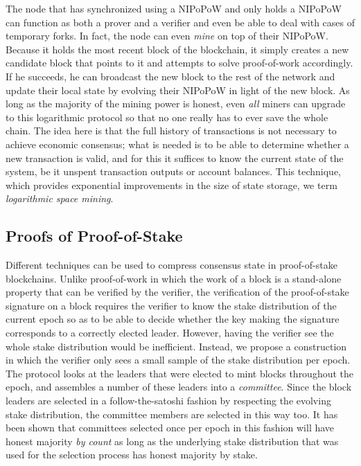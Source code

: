 The node that has synchronized using a NIPoPoW and only holds a NIPoPoW can
function as both a prover and a verifier and even be able to deal with cases
of temporary forks. In fact, the node can even \emph{mine} on top of their
NIPoPoW. Because it holds the most recent block of the blockchain, it simply
creates a new candidate block that points to it and attempts to solve
proof-of-work accordingly. If he succeeds, he can broadcast the new block to the
rest of the network and update their local state by evolving their NIPoPoW in
light of the new block. As long as the majority of the mining power is honest,
even \emph{all} miners can upgrade to this logarithmic protocol so that no one
really has to ever save the whole chain. The idea here is that the full history
of transactions is not necessary to achieve economic consensus; what is needed
is to be able to determine whether a new transaction is valid, and for this it
suffices to know the current state of the system, be it unspent transaction
outputs or account balances. This technique, which provides exponential
improvements in the size of state storage, we term
\emph{logarithmic space mining}.

\subsection{Proofs of Proof-of-Stake}
Different techniques can be used to compress consensus state in proof-of-stake
blockchains. Unlike proof-of-work in which the work of a block is a stand-alone
property that can be verified by the verifier, the verification of the
proof-of-stake signature on a block requires the verifier to know the stake
distribution of the current epoch so as to be able to decide whether the key
making the signature corresponds to a correctly elected leader. However, having
the verifier see the whole stake distribution would be inefficient. Instead, we
propose a construction in which the verifier only sees a small sample of the
stake distribution per epoch. The protocol looks at the leaders that were
elected to mint blocks throughout the epoch, and assembles a number of these
leaders into a \emph{committee}. Since the block leaders are selected in a
follow-the-satoshi fashion by respecting the evolving stake distribution, the
committee members are selected in this way too. It has been shown that
committees selected once per epoch in this fashion will have honest majority
\emph{by count} as long as the underlying stake distribution that was used for
the selection process has honest majority by stake.

